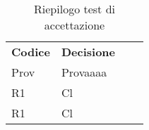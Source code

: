 \begin{table}[H]
	
	\begin{longtable}{ >{\centering}p{} >{\centering}p{}
			>{\centering}p{} >{\centering}p{}}
			
		\rowcolorhead
		\centering \textbf{\color{white}Codice} 
		& \centering \textbf{\color{white}Decisione} 
		
		\tabularnewline 
		
		
		Prov & Provaaaa 
		
		\tabularnewline 
		R1 & Cl 
		
		\tabularnewline 
		R1 & Cl 
	
	
	\end{longtable}
	\caption{Riepilogo test di accettazione}	

\end{table}

